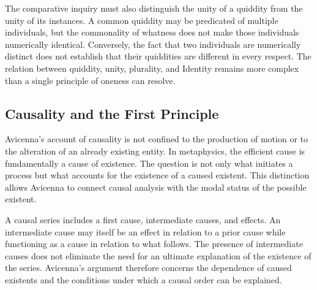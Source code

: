 The comparative inquiry
must also distinguish
the unity of a quiddity
from the unity of its
instances. A common
quiddity may be predicated
of multiple individuals,
but the commonality of
whatness does not make
those individuals numerically
identical. Conversely,
the fact that two individuals
are numerically distinct
does not establish that
their quiddities are
different in every respect.
The relation between
quiddity, unity, plurality,
and Identity remains
more complex than a
single principle of
oneness can resolve.



\subsection{Causality and the First Principle}
\label{subsec:ch08-avicenna-causality}

\label{para:VS.B01.P01.C08.S13.SS10.P001}

Avicenna's account of causality
is not confined to the
production of motion or
to the alteration of
an already existing
entity. In metaphysics,
the efficient cause
is fundamentally a
cause of existence.
The question is not
only what initiates
a process but what
accounts for the
existence of a caused
existent. This distinction
allows Avicenna to
connect causal analysis
with the modal status
of the possible existent.
\citep[Ilahiyyat, VI.1--2 and VIII.1--3]{AvicennaMetaphysics}

\label{para:VS.B01.P01.C08.S13.SS10.P002}

A causal series includes
a first cause, intermediate
causes, and effects.
An intermediate cause
may itself be an effect
in relation to a prior
cause while functioning
as a cause in relation
to what follows. The
presence of intermediate
causes does not eliminate
the need for an ultimate
explanation of the
existence of the series.
Avicenna's argument
therefore concerns the
dependence of caused
existents and the
conditions under which
a causal order can
be explained.
\citep[Ilahiyyat, VIII.1--3]{AvicennaMetaphysics}

\label{para:VS.B01.P01.C08.S13.SS10.P003}

